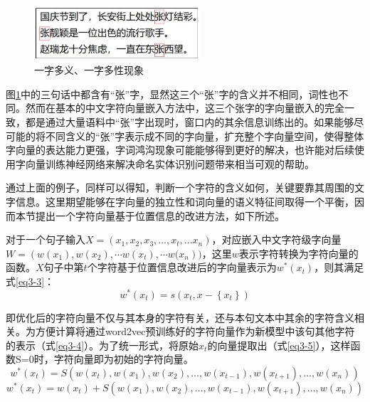 \documentclass[winfonts,master,oneside,nobackinfo]{njuthesis}
\begin{document}
\begin{figure}[ht]
\centering
\includegraphics[width=0.55\textwidth]{./figure/一字多义.jpg}
\caption{一字多义、一字多性现象}
\label{one2many}
\end{figure}

图\ref{one2many}中的三句话中都含有“张”字，显然这三个“张”字的含义并不相同，词性也不同。然而在基本的中文字符向量嵌入方法中，这三个张字的字向量嵌入的完全一致，都是通过大量语料中“张”字出现时，窗口内的其余信息训练出的。如果能够尽可能的将不同含义的“张”字表示成不同的字向量，扩充整个字向量空间，使得整体字向量的表达能力更强，字词鸿沟现象可能能够得到更好的解决，也许能对后续使用字向量训练神经网络来解决命名实体识别问题带来相当可观的帮助。

通过上面的例子，同样可以得知，判断一个字符的含义如何，关键要靠其周围的文字信息。这里期望能够在字向量的独立性和词向量的语义特征间取得一个平衡，因而本节提出一个字符向量基于位置信息的改进方法，如下所述。

对于一个句子输入$X=\left(x_{1}, x_{2}, x_{3},...,x_{t},... x_{n}\right)$，对应嵌入中文字符级字向量$W=\left(w\left(x_{1}\right), w\left(x_{2}\right), \cdots w\left(x_{t}\right), \cdots w(x_{n}\right))$，这里$w$表示字符转换为字符向量的函数。$X$句子中第$t$个字符基于位置信息改进后的字向量表示为$w^{*}(x_{t})$，则其满足式\ref{eq3-3}：
\begin{equation}
w^{*}\left(x_{t}\right)=s\left(x_{t}, x-\left\{x_{t}\right\}\right)
\label{eq3-3}
\end{equation}

即优化后的字符向量不仅与其本身的字符有关，还与本句文本中其余的字符含义相关。为方便计算将通过word2vec预训练好的字符向量作为新模型中该句其他字符的表示（式\ref{eq3-4}）。为了统一形式，将原始$x_{t}$的向量提取出（式\ref{eq3-5}），这样函数S=0时，字符向量即为初始的字符向量。
\begin{equation}
w^{*}\left(x_{t}\right)=S\left(w\left(x_{t}\right), w\left(x_{1}\right), w\left(x_{2}\right), \ldots, w\left(x_{t-1}\right), w\left(x_{t+1}\right), \ldots, w\left(x_{n}\right)\right)
\label{eq3-4}
\end{equation}
\begin{equation}
w^{*}\left(x_{t}\right)=w\left(x_{t}\right)+S\left( w\left(x_{1}\right), w\left(x_{2}\right), \ldots, w\left(x_{t-1}\right), w\left(x_{t+1}\right), \ldots, w\left(x_{n}\right)\right)
\label{eq3-5}
\end{equation}
\end{document}
